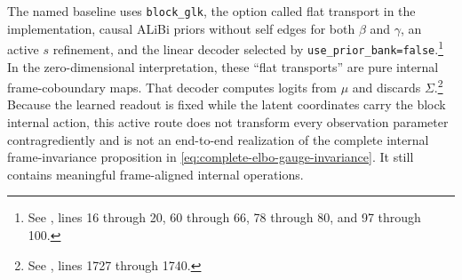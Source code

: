 The named baseline uses \texttt{block\_glk}, the option called flat transport in the implementation, causal ALiBi priors without self edges for both $\beta$ and $\gamma$, an active $s$ refinement, and the linear decoder selected by \texttt{use\_prior\_bank=false}.\footnote{See , lines 16 through 20, 60 through 66, 78 through 80, and 97 through 100.} In the zero-dimensional interpretation, these ``flat transports'' are pure internal frame-coboundary maps. That decoder computes logits from $\mu$ and discards $\Sigma$.\footnote{See , lines 1727 through 1740.} Because the learned readout is fixed while the latent coordinates carry the block internal action, this active route does not transform every observation parameter contragrediently and is not an end-to-end realization of the complete internal frame-invariance proposition in \cref{eq:complete-elbo-gauge-invariance}. It still contains meaningful frame-aligned internal operations.

